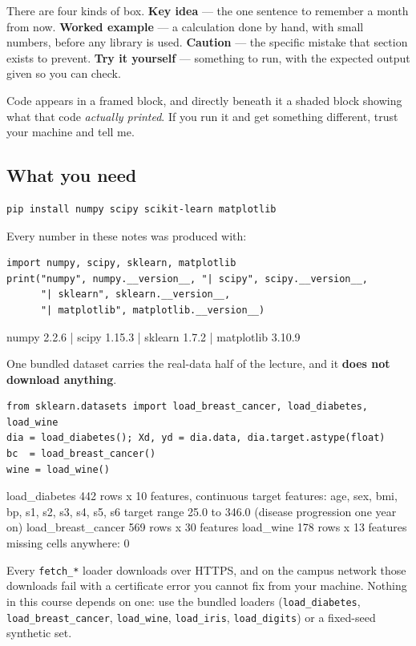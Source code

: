 \documentclass[11pt]{article}
\begin{document}
There are four kinds of box. \textbf{Key idea} --- the one sentence to
remember a month from now. \textbf{Worked example} --- a calculation done by
hand, with small numbers, before any library is used. \textbf{Caution} --- the
specific mistake that section exists to prevent. \textbf{Try it yourself} ---
something to run, with the expected output given so you can check.

Code appears in a framed block, and directly beneath it a shaded block showing
what that code \emph{actually printed}. If you run it and get something
different, trust your machine and tell me.

\subsection{What you need}

\begin{lstlisting}
pip install numpy scipy scikit-learn matplotlib
\end{lstlisting}

Every number in these notes was produced with:

\begin{lstlisting}
import numpy, scipy, sklearn, matplotlib
print("numpy", numpy.__version__, "| scipy", scipy.__version__,
      "| sklearn", sklearn.__version__,
      "| matplotlib", matplotlib.__version__)
\end{lstlisting}
\begin{codeout}
numpy 2.2.6 | scipy 1.15.3 | sklearn 1.7.2 | matplotlib 3.10.9
\end{codeout}

One bundled dataset carries the real-data half of the lecture, and it
\textbf{does not download anything}.

\begin{lstlisting}
from sklearn.datasets import load_breast_cancer, load_diabetes, load_wine
dia = load_diabetes(); Xd, yd = dia.data, dia.target.astype(float)
bc  = load_breast_cancer()
wine = load_wine()
\end{lstlisting}
\begin{codeout}
load_diabetes      442 rows x 10 features, continuous target
   features: age, sex, bmi, bp, s1, s2, s3, s4, s5, s6
   target range 25.0 to 346.0 (disease progression one year on)
load_breast_cancer 569 rows x 30 features
load_wine          178 rows x 13 features
missing cells anywhere: 0
\end{codeout}

\begin{caution}
Every \texttt{fetch\_*} loader downloads over HTTPS, and on the campus network
those downloads fail with a certificate error you cannot fix from your
machine. Nothing in this course depends on one: use the bundled loaders
(\texttt{load\_diabetes}, \texttt{load\_breast\_cancer}, \texttt{load\_wine},
\texttt{load\_iris}, \texttt{load\_digits}) or a fixed-seed synthetic set.
\end{caution}
\end{document}
